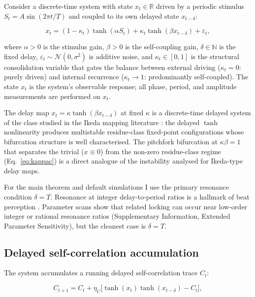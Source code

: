 Consider a discrete-time system with state $x_t \in \mathbb{R}$ driven by a periodic stimulus $S_t = A\sin(2\pi t/T)$ and coupled to its own delayed state $x_{t-\delta}$:

\begin{equation}\label{eq:state}
x_t = (1-\kappa_t)\tanh(\alpha S_t) + \kappa_t\tanh(\beta x_{t-\delta}) + \varepsilon_t,
\end{equation}

where $\alpha > 0$ is the stimulus gain, $\beta > 0$ is the self-coupling gain, $\delta \in \mathbb{N}$ is the fixed delay, $\varepsilon_t \sim \mathcal{N}(0,\sigma^2)$ is additive noise, and $\kappa_t \in [0,1]$ is the structural consolidation variable that gates the balance between external driving ($\kappa_t=0$: purely driven) and internal recurrence ($\kappa_t \to 1$: predominantly self-coupled). The state $x_t$ is the system's observable response; all phase, period, and amplitude measurements are performed on $x_t$.

The delay map $x_t = \kappa\tanh(\beta x_{t-\delta})$ at fixed $\kappa$ is a discrete-time delayed system of the class studied in the Ikeda mapping literature \cite{ikeda1979multiple, yanchuk2009delayed}: the delayed $\tanh$ nonlinearity produces multistable residue-class fixed-point configurations whose bifurcation structure is well characterised. The pitchfork bifurcation at $\kappa\beta = 1$ that separates the trivial ($x\equiv0$) from the non-zero residue-class regime (Eq.~\eqref{eq:kappac}) is a direct analogue of the instability analysed for Ikeda-type delay maps.

For the main theorem and default simulations I use the primary resonance condition $\delta = T$. Resonance at integer delay-to-period ratios is a hallmark of beat perception \cite{large1999resonance, large2002perceiving, large2002tracking, nozaradan2011tagging, patel2008music}. Parameter scans show that related locking can occur near low-order integer or rational resonance ratios (Supplementary Information, Extended Parameter Sensitivity), but the cleanest case is $\delta = T$.

\subsection{Delayed self-correlation accumulation}

The system accumulates a running delayed self-correlation trace $C_t$:

\begin{equation}\label{eq:corr}
C_{t+1} = C_t + \eta_C\big[\tanh(x_t)\tanh(x_{t-\delta}) - C_t\big],
\end{equation}

